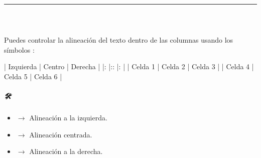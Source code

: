 \documentclass[a4paper,10pt,spanish]{sphinxmanual}
\begin{document}
\bigskip\hrule\bigskip



\subsubsection{}
\label{\detokenize{configuracion_inicial/013.guia_de_myst_parser:tablas-con-alineacion}}

\paragraph{📌 }
\label{\detokenize{configuracion_inicial/013.guia_de_myst_parser:alinear-el-contenido-de-las-columnas}}
\sphinxAtStartPar
Puedes controlar la alineación del texto dentro de las columnas usando los símbolos \sphinxcode{\sphinxupquote{:}}:

\begin{sphinxVerbatim}[commandchars=\\\{\}]
| Izquierda   | Centro     | Derecha   |
|:\PYGZhy{}\PYGZhy{}\PYGZhy{}\PYGZhy{}\PYGZhy{}\PYGZhy{}\PYGZhy{}\PYGZhy{}\PYGZhy{}\PYGZhy{}\PYGZhy{} |:\PYGZhy{}\PYGZhy{}\PYGZhy{}\PYGZhy{}\PYGZhy{}\PYGZhy{}\PYGZhy{}\PYGZhy{}\PYGZhy{}: |\PYGZhy{}\PYGZhy{}\PYGZhy{}\PYGZhy{}\PYGZhy{}\PYGZhy{}\PYGZhy{}\PYGZhy{}\PYGZhy{}: |
| Celda 1     | Celda 2    | Celda 3   |
| Celda 4     | Celda 5    | Celda 6   |
\end{sphinxVerbatim}


\subparagraph{🛠️ }
\label{\detokenize{configuracion_inicial/013.guia_de_myst_parser:id2}}\begin{itemize}
\item {} 
\sphinxAtStartPar
\sphinxcode{\sphinxupquote{:\sphinxhyphen{}\sphinxhyphen{}\sphinxhyphen{}}} \(\rightarrow\) Alineación a la izquierda.

\item {} 
\sphinxAtStartPar
\sphinxcode{\sphinxupquote{:\sphinxhyphen{}\sphinxhyphen{}\sphinxhyphen{}:}} \(\rightarrow\) Alineación centrada.

\item {} 
\sphinxAtStartPar
\sphinxcode{\sphinxupquote{\sphinxhyphen{}\sphinxhyphen{}\sphinxhyphen{}:}} \(\rightarrow\) Alineación a la derecha.

\end{itemize}

\sphinxAtStartPar
{}
\end{document}

